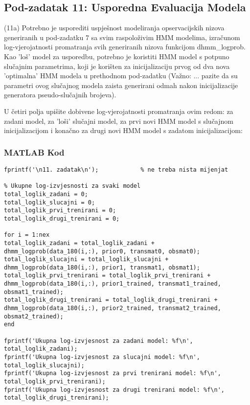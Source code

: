 \documentclass[12pt]{article}
\begin{document}
	\subsection{Pod-zadatak 11: Usporedna Evaluacija Modela}
	(11a) Potrebno je usporediti uspješnost modeliranja opservacijskih nizova generiranih u pod-zadatku 7 sa svim raspoloživim HMM modelima, izračunom log-vjerojatnosti promatranja svih generiranih nizova funkcijom dhmm\_logprob. Kao 'loš' model za usporedbu, potrebno je koristiti HMM model s potpuno slučajnim parametrima, koji je korišten za inicijalizaciju prvog od dva nova 'optimalna' HMM modela u prethodnom pod-zadatku (Važno: ... pazite da su parametri ovog slučajnog modela zaista generirani odmah nakon inicijalizacije generatora pseudo-slučajnih brojeva).
	
	U četiri polja upišite dobivene log-vjerojatnosti promatranja ovim redom: za zadani model, za 'loši' slučajni model, za prvi novi HMM model s slučajnom inicijalizacijom i konačno za drugi novi HMM model s zadatom inicijalizacijom:
	
	\subsubsection*{MATLAB Kod}
	\begin{lstlisting}
fprintf('\n11. zadatak\n');            % ne treba nista mijenjat

% Ukupne log-izvjesnosti za svaki model
total_loglik_zadani = 0;
total_loglik_slucajni = 0;
total_loglik_prvi_trenirani = 0;
total_loglik_drugi_trenirani = 0;

for i = 1:nex
total_loglik_zadani = total_loglik_zadani + dhmm_logprob(data_180(i,:), prior0, transmat0, obsmat0);
total_loglik_slucajni = total_loglik_slucajni + dhmm_logprob(data_180(i,:), prior1, transmat1, obsmat1);
total_loglik_prvi_trenirani = total_loglik_prvi_trenirani + dhmm_logprob(data_180(i,:), prior1_trained, transmat1_trained, obsmat1_trained);
total_loglik_drugi_trenirani = total_loglik_drugi_trenirani + dhmm_logprob(data_180(i,:), prior2_trained, transmat2_trained, obsmat2_trained);
end

fprintf('Ukupna log-izvjesnost za zadani model: %f\n', total_loglik_zadani);
fprintf('Ukupna log-izvjesnost za slucajni model: %f\n', total_loglik_slucajni);
fprintf('Ukupna log-izvjesnost za prvi trenirani model: %f\n', total_loglik_prvi_trenirani);
fprintf('Ukupna log-izvjesnost za drugi trenirani model: %f\n', total_loglik_drugi_trenirani);
	\end{lstlisting}
	
\end{document}
